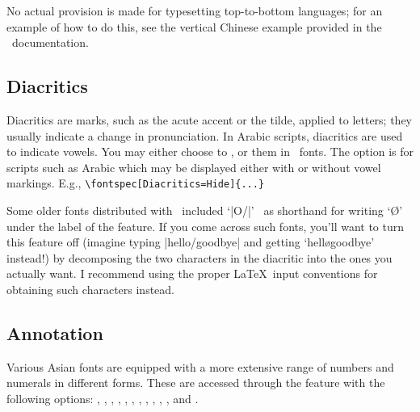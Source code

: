 \documentclass[a4paper]{l3doc}
\begin{document}
No actual provision is made for typesetting top-to-bottom
languages; for an example of how to do this, see the vertical Chinese
example provided in the \XeTeX\ documentation.




\subsection{Diacritics}
Diacritics are marks, such as the acute accent or the tilde, applied to letters; they usually indicate a change in pronunciation.
In Arabic scripts, diacritics are used to indicate vowels.
You may either choose
to ,  or  them in \AAT\ fonts.
The  option is for scripts such as Arabic which may be
displayed either with or without vowel markings. E.g.,
\verb|\fontspec[Diacritics=Hide]{...}|

Some older fonts distributed with \MacOSX\ included `|O/|' \etc\ as shorthand for writing `\O' under the label of the  feature. If you come across such fonts, you'll
want to turn this feature off (imagine typing |hello/goodbye| and
getting `hell\o goodbye' instead!) by decomposing the two characters
in the diacritic into the ones you actually
want. I recommend using
the proper \LaTeX\ input conventions for obtaining such characters
instead.



\subsection{Annotation}
Various Asian fonts are equipped with a more extensive range of
numbers and numerals in different forms. These are accessed through
the  feature with the following
options: ,
, , , ,
, , , ,
, , and .
\end{document}

